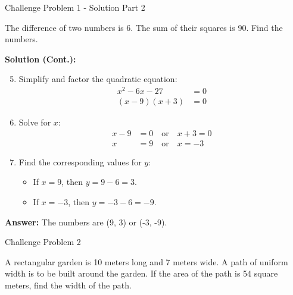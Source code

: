 \documentclass[aspectratio=169]{beamer}
\begin{document}
\begin{frame}{Challenge Problem 1 - Solution Part 2}
    \begin{tcolorbox}[colback=lightgray,colframe=accent,title=Detailed Solution (Part 2)]
        \footnotesize
        The difference of two numbers is 6. The sum of their squares is 90. Find the numbers.
        
        \textbf{Solution (Cont.):}
        \begin{enumerate}
            \setcounter{enumi}{4} %
            \setlength{\itemsep}{0.5em}
            \item Simplify and factor the quadratic equation:
            \begin{align*}
                x^2 - 6x - 27 &= 0 \\
                (x - 9)(x + 3) &= 0
            \end{align*}
            \item Solve for $x$:
            \begin{align*}
                x - 9 &= 0 \quad \text{or} \quad x + 3 = 0 \\
                x &= 9 \quad \text{or} \quad x = -3
            \end{align*}
            \item Find the corresponding values for $y$:
            \begin{itemize}
                \item If $x = 9$, then $y = 9 - 6 = 3$.
                \item If $x = -3$, then $y = -3 - 6 = -9$.
            \end{itemize}
        \end{enumerate}
        
        \textbf{Answer:} The numbers are (9, 3) or (-3, -9).
    \end{tcolorbox}
\end{frame}

\begin{frame}{Challenge Problem 2}
    \begin{tcolorbox}[colback=lightgray,colframe=primary,title=Problem]
        \footnotesize
        A rectangular garden is 10 meters long and 7 meters wide. A path of uniform width is to be built around the garden. If the area of the path is 54 square meters, find the width of the path.
    \end{tcolorbox}
\end{frame}
\end{document}

